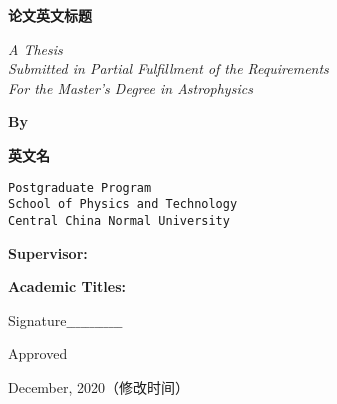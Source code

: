 \newpage
 \fancyfoot{} %
\renewcommand{\thepage}{cover.en}
\begin{center}

 \textbf{\xiaoerhao\bf \hei  论文英文标题}\\

 \vspace*{1.5cm}

{\large \sl A Thesis\\
\vspace*{0.4cm}
Submitted in Partial Fulfillment of the Requirements \\
\vspace*{0.4cm}For the Master's Degree in Astrophysics\\}

\vspace*{2cm}

{\normalsize\sanhao\hei\bf By}

\vspace*{0.4cm}

{\normalsize\sanhao\hei\bf 英文名}

\vspace*{0.4cm}

{\large \you \tt Postgraduate Program\\
\vspace*{0.4cm}
School of Physics and Technology\\
\vspace*{0.4cm} Central China Normal University\\}

\vspace*{2cm}

\textbf{\normalsize\sanhao\hei\bf Supervisor:
\hspace{1em}{\normalsize\sanhao\hei\bf  导师英文名}\hfill}

\vspace*{0.4cm}

\textbf{\normalsize\sanhao\hei\bf Academic Titles:
\hspace{1em}{\normalsize\sanhao\hei\bf 导师职称} \hfill}


\vspace*{0.5cm}

{\normalsize\sanhao \hfill Signature$\_ \_ \_ \_ \_ \_ \_ \_ \_ \_ \_ \_$}

\vspace*{0.3cm}

{\normalsize\sanhao \hfill Approved}

\vspace*{0.3cm}

{\normalsize\sanhao \hfill December, \hspace{0.5em}2020（修改时间）}

\vspace{\fill}

\end{center}
\newpage
